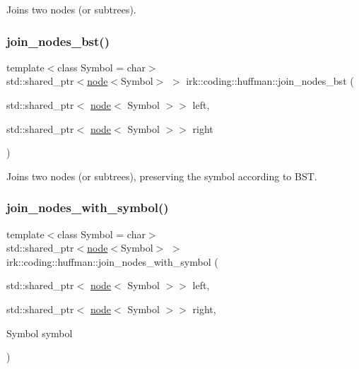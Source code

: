 Joins two nodes (or subtrees). 

\mbox{\label{namespaceirk_1_1coding_1_1huffman_a0047a6b58624bf6178ebbf15bc71f9d6}} 
\subsubsection{\texorpdfstring{join\+\_\+nodes\+\_\+bst()}{join\_nodes\_bst()}}
{\footnotesize\ttfamily template$<$class Symbol  = char$>$ \\
std\+::shared\+\_\+ptr$<$\mbox{\hyperlink{structirk_1_1coding_1_1huffman_1_1node}{node}}$<$Symbol$>$ $>$ irk\+::coding\+::huffman\+::join\+\_\+nodes\+\_\+bst (\begin{DoxyParamCaption}\item[{std\+::shared\+\_\+ptr$<$ \mbox{\hyperlink{structirk_1_1coding_1_1huffman_1_1node}{node}}$<$ Symbol $>$$>$}]{left,  }\item[{std\+::shared\+\_\+ptr$<$ \mbox{\hyperlink{structirk_1_1coding_1_1huffman_1_1node}{node}}$<$ Symbol $>$$>$}]{right }\end{DoxyParamCaption})}



Joins two nodes (or subtrees), preserving the symbol according to B\+ST. 

\mbox{\label{namespaceirk_1_1coding_1_1huffman_a504575bbf01c932df8cf77ef6f5e9330}} 
\subsubsection{\texorpdfstring{join\+\_\+nodes\+\_\+with\+\_\+symbol()}{join\_nodes\_with\_symbol()}}
{\footnotesize\ttfamily template$<$class Symbol  = char$>$ \\
std\+::shared\+\_\+ptr$<$\mbox{\hyperlink{structirk_1_1coding_1_1huffman_1_1node}{node}}$<$Symbol$>$ $>$ irk\+::coding\+::huffman\+::join\+\_\+nodes\+\_\+with\+\_\+symbol (\begin{DoxyParamCaption}\item[{std\+::shared\+\_\+ptr$<$ \mbox{\hyperlink{structirk_1_1coding_1_1huffman_1_1node}{node}}$<$ Symbol $>$$>$}]{left,  }\item[{std\+::shared\+\_\+ptr$<$ \mbox{\hyperlink{structirk_1_1coding_1_1huffman_1_1node}{node}}$<$ Symbol $>$$>$}]{right,  }\item[{Symbol}]{symbol }\end{DoxyParamCaption})}



